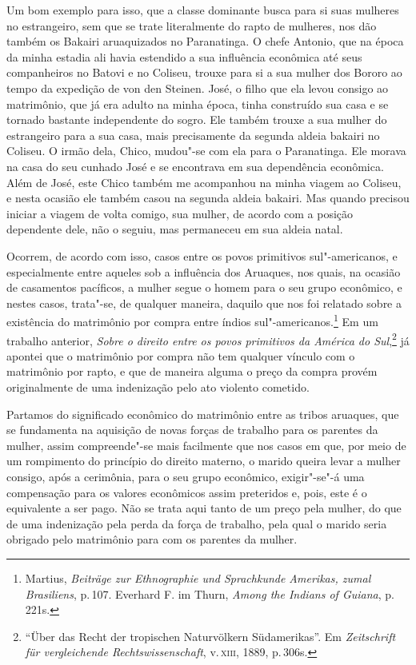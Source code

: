 Um bom exemplo para isso, que a classe dominante busca para si suas
mulheres no estrangeiro, sem que se trate literalmente do rapto de
mulheres, nos dão também os Bakairi aruaquizados no Paranatinga. O
chefe Antonio, que na época da minha estadia ali havia estendido a sua
influência econômica até seus companheiros no Batovi e no Coliseu,
trouxe para si a sua mulher dos Bororo ao tempo da expedição de von den
Steinen. José, o filho que ela levou consigo ao matrimônio, que já era
adulto na minha época, tinha construído sua casa e se tornado bastante
independente do sogro. Ele também trouxe a sua mulher do estrangeiro
para a sua casa, mais precisamente da segunda aldeia bakairi no Coliseu.
O irmão dela, Chico, mudou"-se com ela para o Paranatinga. Ele morava na
casa do seu cunhado José e se encontrava em sua dependência econômica.
Além de José, este Chico também me acompanhou na minha viagem ao
Coliseu, e nesta ocasião ele também casou na segunda aldeia bakairi. Mas
quando precisou iniciar a viagem de volta comigo, sua mulher, de
acordo com a posição dependente dele, não o seguiu, mas permaneceu em
sua aldeia natal.

Ocorrem, de acordo com isso, casos entre os povos primitivos
sul"-americanos, e especialmente entre aqueles sob a influência dos
Aruaques, nos quais, na ocasião de casamentos pacíficos, a mulher segue
o homem para o seu grupo econômico, e nestes casos, trata"-se, de
qualquer maneira, daquilo que nos foi relatado sobre a existência do
matrimônio por compra entre índios
sul"-americanos.\footnote{Martius, \textit{Beiträge zur Ethnographie und
  Sprachkunde Amerikas, zumal Brasiliens}, p.\,107. Everhard F. im
  Thurn, \textit{Among the Indians of Guiana}, p.\,221s.} Em um trabalho
anterior, \textit{Sobre o direito entre os povos primitivos da América do
Sul},\footnote{``Über das Recht der tropischen Naturvölkern Südamerikas''. Em \textit{Zeitschrift für vergleichende
  Rechtswissenschaft}, v.\,\textsc{xiii}, 1889, p.\,306s.} já apontei que o
matrimônio por compra não tem qualquer vínculo com o matrimônio por
rapto, e que de maneira alguma o preço da compra provém originalmente de
uma indenização pelo ato violento cometido. 

Partamos do significado
econômico do matrimônio entre as tribos aruaques, que se fundamenta na
aquisição de novas forças de trabalho para os parentes da mulher, assim
compreende"-se mais facilmente que nos casos em que, por meio de um
rompimento do princípio do direito materno, o marido queira levar a mulher
consigo, após a cerimônia, para o seu grupo econômico, exigir"-se"-á uma
compensação para os valores econômicos assim preteridos e, pois, este é
o equivalente a ser pago. Não se trata aqui tanto de um preço pela
mulher, do que de uma indenização pela perda da força de trabalho, pela
qual o marido seria obrigado pelo matrimônio para com os parentes da
mulher.

